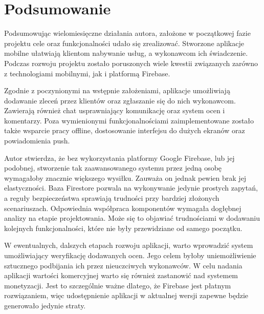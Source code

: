 \chapter{Podsumowanie}

Podsumowując wielomiesięczne działania autora, założone w początkowej fazie projektu cele oraz funkcjonalności udało się zrealizować. Stworzone aplikacje mobilne ułatwiają klientom nabywanie usług, a wykonawcom ich świadczenie. Podczas rozwoju projektu zostało poruszonych wiele kwestii związanych zarówno z technologiami mobilnymi, jak i platformą Firebase.

Zgodnie z poczynionymi na wstępnie założeniami, aplikacje umożliwiają dodawanie zleceń przez klientów oraz zgłaszanie się do nich wykonawcom. Zawierają również chat usprawniający komunikację oraz system ocen i komentarzy. Poza wymienionymi funkcjonalnościami zaimplementowane zostało także wsparcie pracy offline, dostosowanie interfejsu do dużych ekranów oraz powiadomienia push.

Autor stwierdza, że bez wykorzystania platformy Google Firebase, lub jej podobnej, stworzenie tak zaawansowanego systemu przez jedną osobę wymagałoby znacznie większego wysiłku. Zauważa on jednak pewien brak jej elastyczności. Baza Firestore pozwala na wykonywanie jedynie prostych zapytań, a reguły bezpieczeństwa sprawiają trudności przy bardziej złożonych scenariuszach. Odpowiednia współpraca komponentów wymagała dogłębnej analizy na etapie projektowania. Może się to objawiać trudnościami w dodawaniu kolejnych funkcjonalności, które nie były przewidziane od samego początku.


W ewentualnych, dalszych etapach rozwoju aplikacji, warto wprowadzić system umożliwiający weryfikację dodawanych ocen. Jego celem byłoby uniemożliwienie sztucznego podbijania ich przez nieuczciwych wykonawców. W celu nadania aplikacji wartości komercyjnej warto się również zastanowić nad systemem monetyzacji. Jest to szczególnie ważne dlatego, że Firebase jest płatnym rozwiązaniem, więc udostępnienie aplikacji w aktualnej wersji zapewne będzie generowało jedynie straty. 


